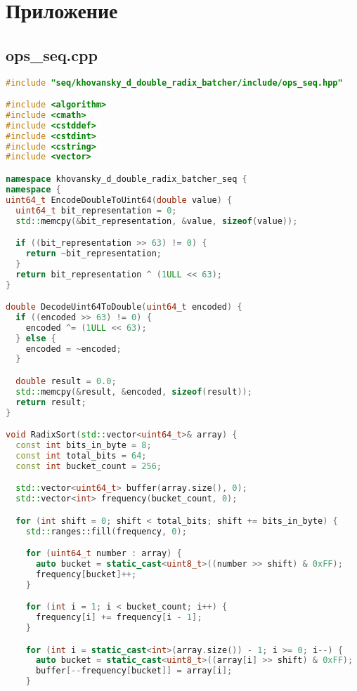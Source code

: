 \documentclass[12pt]{article}
\begin{document}
\newpage

\section*{Приложение}

\subsection*{ops\_seq.cpp}
\begin{lstlisting}[language=C++,
    breaklines=true,       % Автоматический перенос строк
    columns=fullflexible ]
#include "seq/khovansky_d_double_radix_batcher/include/ops_seq.hpp"

#include <algorithm>
#include <cmath>
#include <cstddef>
#include <cstdint>
#include <cstring>
#include <vector>

namespace khovansky_d_double_radix_batcher_seq {
namespace {
uint64_t EncodeDoubleToUint64(double value) {
  uint64_t bit_representation = 0;
  std::memcpy(&bit_representation, &value, sizeof(value));

  if ((bit_representation >> 63) != 0) {
    return ~bit_representation;
  }
  return bit_representation ^ (1ULL << 63);
}

double DecodeUint64ToDouble(uint64_t encoded) {
  if ((encoded >> 63) != 0) {
    encoded ^= (1ULL << 63);
  } else {
    encoded = ~encoded;
  }

  double result = 0.0;
  std::memcpy(&result, &encoded, sizeof(result));
  return result;
}

void RadixSort(std::vector<uint64_t>& array) {
  const int bits_in_byte = 8;
  const int total_bits = 64;
  const int bucket_count = 256;

  std::vector<uint64_t> buffer(array.size(), 0);
  std::vector<int> frequency(bucket_count, 0);

  for (int shift = 0; shift < total_bits; shift += bits_in_byte) {
    std::ranges::fill(frequency, 0);

    for (uint64_t number : array) {
      auto bucket = static_cast<uint8_t>((number >> shift) & 0xFF);
      frequency[bucket]++;
    }

    for (int i = 1; i < bucket_count; i++) {
      frequency[i] += frequency[i - 1];
    }

    for (int i = static_cast<int>(array.size()) - 1; i >= 0; i--) {
      auto bucket = static_cast<uint8_t>((array[i] >> shift) & 0xFF);
      buffer[--frequency[bucket]] = array[i];
    }


\end{lstlisting}
\end{document}

